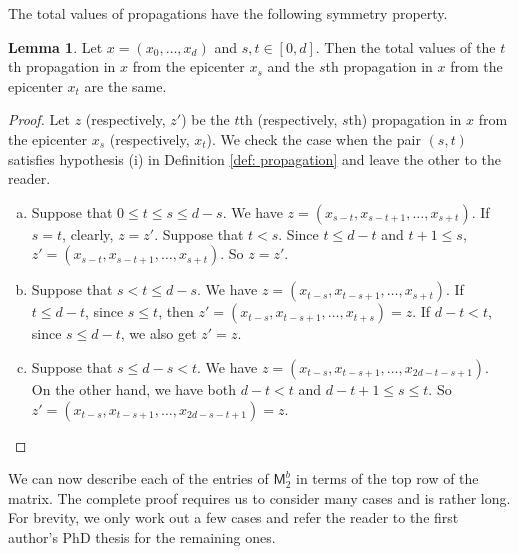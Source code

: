 \documentclass[12pt,reqno]{amsart}
\renewcommand{\leq}{\leqslant}
\newcommand{\M}{\mathsf{M}}
\theoremstyle{definition}
\newtheorem{lem}[thm]{Lemma}
\numberwithin{equation}{section}
\begin{document}
The total values of propagations have the following symmetry property. 

\begin{lem}\label{L:propsymm}
  Let $x=(x_0,\ldots,x_d)$ and $s,t\in[0,d]$. Then the total values of the $t$th propagation in $x$ from the epicenter $x_s$ and the $s$th propagation in $x$ from the epicenter $x_t$ are the same.
\end{lem}
\begin{proof}
  Let $z$ (respectively, $z'$) be the $t$th (respectively, $s$th) propagation in $x$ from the epicenter $x_s$ (respectively, $x_t$). We check the case when the pair $(s,t)$ satisfies hypothesis (i) in Definition \ref{def: propagation} and leave the other to the reader. 
  \begin{enumerate}[(a)]
    \item Suppose that $0\leq t\leq s\leq d-s$. We have $z=(x_{s-t},x_{s-t+1},\ldots,x_{s+t})$. If $s=t$, clearly, $z=z'$. Suppose that $t<s$. Since $t\leq d-t$ and $t+1\leq s$, $z'=(x_{s-t},x_{s-t+1},\ldots,x_{s+t})$. So $z=z'$.
    \item Suppose that $s<t\leq d-s$. We have $z=(x_{t-s},x_{t-s+1},\ldots,x_{s+t})$. If $t\leq d-t$, since $s\leq t$, then $z'=(x_{t-s},x_{t-s+1},\ldots,x_{t+s})=z$. If $d-t<t$, since $s\leq d-t$, we also get $z'=z$.
    \item Suppose that $s\leq d-s<t$. We have $z= (x_{t-s},x_{t-s+1},\ldots,x_{2d-t-s+1})$. On the other hand, we have both $d-t<t$ and $d-t+1\leq s\leq t$. So $z'=(x_{t-s},x_{t-s+1},\ldots,x_{2d-s-t+1})=z$. 
  \end{enumerate} 
\end{proof}

We can now describe each of the entries of $\M_2^b$ in terms of the top row of the matrix. The complete proof requires us to consider many cases and is rather long. For brevity, we only work out a few cases and refer the reader to the first author's PhD thesis \cite{KuaThesis} for the remaining ones. 
\end{document}
